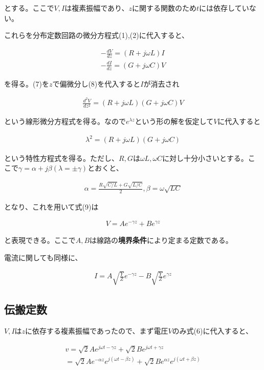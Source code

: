 \documentclass[7pt,uplatex,dvipdfmx,twocolumn]{jsarticle}
\begin{document}
とする。ここで$V,I$は複素振幅であり、$z$に関する関数のため$t$には依存していない。

これらを分布定数回路の微分方程式(1),(2)に代入すると、

\begin{align}
  -\frac{dV}{dz}=(R+j\omega L)I\\
  -\frac{dI}{dz}=(G+j\omega C)V
  \end{align}

を得る。(7)を$z$で偏微分し(8)を代入すると$I$が消去され

\begin{align}
  \frac{d^2 V}{dz^2}=(R+j\omega L)(G+j\omega C)V
  \end{align}

という線形微分方程式を得る。なので$e^{\lambda z}$という形の解を仮定して$V$に代入すると

\begin{align}
  \lambda ^2=(R+j\omega L)(G+j\omega C)
  \end{align}

という特性方程式を得る。ただし、$R,G$は$\omega L,\omega C$に対し十分小さいとする。ここで$\gamma = \alpha +j\beta(\lambda = \pm \gamma)$とおくと、

\begin{align}
  \alpha = \frac{R\sqrt{C/L}+G\sqrt{L/C}}{2}, \beta = \omega \sqrt{LC}
  \end{align}

となり、これを用いて式(9)は

\begin{align}
  V=Ae^{-\gamma z}+Be^{\gamma z}
\end{align}

と表現できる。ここで$A,B$は線路の\textbf{境界条件}により定まる定数である。

電流に関しても同様に、

\begin{align}
  I=A\sqrt{\frac{Y}{Z}}e^{-\gamma z}-B\sqrt{\frac{Y}{Z}}e^{\gamma z}
\end{align}

\subsection{伝搬定数}

$V,I$は$z$に依存する複素振幅であったので、まず電圧$V$のみ式(6)に代入すると、

\begin{align}
  v=\sqrt{2}Ae^{j\omega t-\gamma z}+\sqrt{2}Be^{j\omega t+\gamma z}\\
  =\sqrt{2}Ae^{-\alpha z}e^{j(\omega t-\beta z)}+\sqrt{2}Be^{\alpha z}e^{j(\omega t+\beta z)}
  \end{align}
\end{document}
